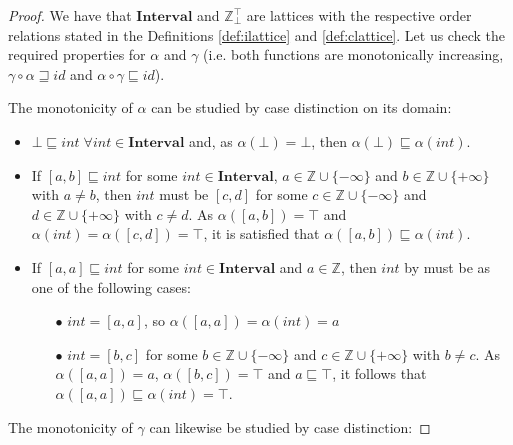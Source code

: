 \documentclass{article}
\begin{document}
\begin{proof}
  We have that $\textbf{Interval}$ and $\mathbb{Z}_\bot^\top$ are 
  lattices with the respective order relations stated in the 
  Definitions \ref{def:ilattice} and \ref{def:clattice}. Let us 
  check the required properties for $\alpha$ and $\gamma$ (i.e. 
  both functions are monotonically increasing, 
  $\gamma \circ \alpha \sqsupseteq id$ and 
  $\alpha \circ \gamma \sqsubseteq id$).

  The monotonicity of $\alpha$ can be studied by case distinction 
  on its domain:

  \begin{itemize}
    \item $\bot \sqsubseteq int 
      \; \forall int \in \textbf{Interval}$ and, as $\alpha(\bot) = 
      \bot$, then $\alpha(\bot) \sqsubseteq \alpha(int)$.
    
    \item If $[a, b] \sqsubseteq int$ for some $int \in 
      \textbf{Interval}$, $a \in \mathbb{Z} \cup \{-\infty\}$ and 
      $b \in \mathbb{Z} \cup \{+\infty\}$ with $a \neq b$, then 
      $int$ must be $[c, d]$ for some $c \in \mathbb{Z} \cup 
      \{-\infty\}$ and $d \in \mathbb{Z} \cup \{+\infty\}$
      with $c \neq d$. As $\alpha([a, b]) = \top$ and $\alpha(int) =
      \alpha([c, d]) = \top$, it is satisfied that $\alpha([a, b]) 
      \sqsubseteq \alpha(int)$.

    \item If $[a, a] \sqsubseteq int$ for some $int \in 
      \textbf{Interval}$ and $a \in \mathbb{Z}$, then $int$ by must 
      be as one of the following cases:
      
      \begin{itemize}
        \item[$\bullet$] $int = [a, a]$, so $\alpha([a, a]) = 
          \alpha(int) = a$
          
        \item[$\bullet$] $int = [b, c]$ for some $b \in \mathbb{Z} 
          \cup \{-\infty\}$ and $c \in \mathbb{Z} \cup \{+\infty\}$ 
          with $b \neq c$. As $\alpha([a, a]) = a$, $\alpha([b, c]) =
          \top$ and $a \sqsubseteq \top$, it follows that 
          $\alpha([a, a]) \sqsubseteq \alpha(int) = \top$.
        \end{itemize}
  \end{itemize}

  The monotonicity of $\gamma$ can likewise be studied by case 
  distinction:


\end{proof}
\end{document}
